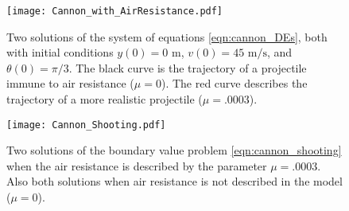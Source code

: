 \begin{figure}
\texttt{[image: Cannon\_with\_AirResistance.pdf]}
\caption{Two solutions of the system of equations \eqref{eqn:cannon_DEs}, both with initial conditions  $y(0) = 0 \text{ m}$, $ v(0) = 45 \text{ m/s}$, and $\theta(0)=\pi/3$.
The black curve is the trajectory of a projectile immune to air resistance ($\mu = 0$).
The red curve describes the trajectory of a more realistic projectile ($\mu = .0003$).}
\label{fig:shooting_cannon_comparison1}
\end{figure}

\begin{figure}
\texttt{[image: Cannon\_Shooting.pdf]}
\caption{Two solutions of the boundary value problem \eqref{eqn:cannon_shooting} when the air resistance is described by the parameter $\mu = .0003$.
Also both solutions when air resistance is not described in the model ($\mu = 0$).}
\label{fig:shooting_cannon_comparison2}
\end{figure} 